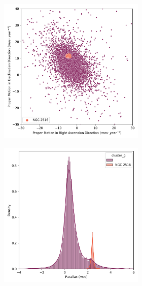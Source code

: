 \documentclass[11pt,a4paper,english,twocolumn]{article}
\begin{document}
\begin{figure}[htbp]
  \centering
  \begin{subfigure}{\columnwidth}
    \centering
    \begin{subfigure}[t]{0.30\textwidth}
      \centering
      \includegraphics[width=\textwidth]{../figures/ngc_2516/pm_ngc_2516.png}
    \end{subfigure}
    \hfill
    \begin{subfigure}[t]{0.30\textwidth}
      \centering
      \includegraphics[width=\textwidth]{../figures/ngc_2516/parallax_ngc_2516.png}

\end{subfigure}
\end{subfigure}
\end{figure}
\end{document}
